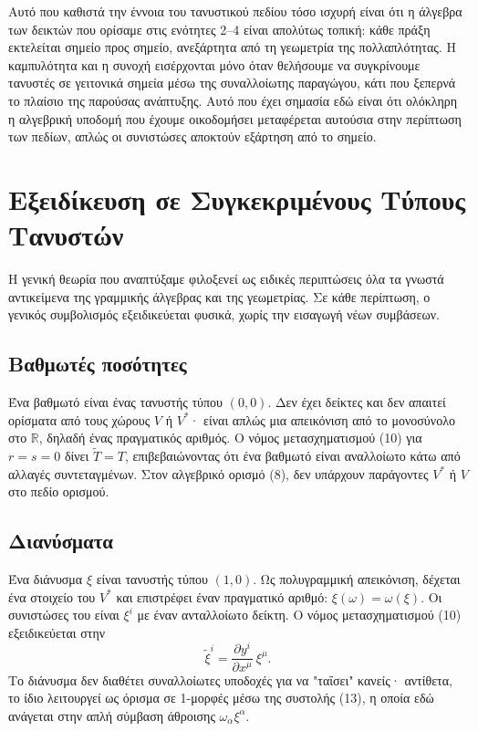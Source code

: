 \documentclass[12pt]{article}
\begin{document}
Αυτό που καθιστά την έννοια του τανυστικού πεδίου τόσο ισχυρή είναι ότι η άλγεβρα των δεικτών που ορίσαμε στις ενότητες 2–4 είναι απολύτως τοπική: κάθε πράξη εκτελείται σημείο προς σημείο, ανεξάρτητα από τη γεωμετρία της πολλαπλότητας. Η καμπυλότητα και η συνοχή εισέρχονται μόνο όταν θελήσουμε να συγκρίνουμε τανυστές σε γειτονικά σημεία μέσω της συναλλοίωτης παραγώγου, κάτι που ξεπερνά το πλαίσιο της παρούσας ανάπτυξης. Αυτό που έχει σημασία εδώ είναι ότι ολόκληρη η αλγεβρική υποδομή που έχουμε οικοδομήσει μεταφέρεται αυτούσια στην περίπτωση των πεδίων, απλώς οι συνιστώσες αποκτούν εξάρτηση από το σημείο.

\section{Εξειδίκευση σε Συγκεκριμένους Τύπους Τανυστών}

Η γενική θεωρία που αναπτύξαμε φιλοξενεί ως ειδικές περιπτώσεις όλα τα γνωστά αντικείμενα της γραμμικής άλγεβρας και της γεωμετρίας. Σε κάθε περίπτωση, ο γενικός συμβολισμός εξειδικεύεται φυσικά, χωρίς την εισαγωγή νέων συμβάσεων.

\subsection{Βαθμωτές ποσότητες}
Ένα βαθμωτό είναι ένας τανυστής τύπου \( (0,0) \). Δεν έχει δείκτες και δεν απαιτεί ορίσματα από τους χώρους \( V \) ή \( V^* \)· είναι απλώς μια απεικόνιση από το μονοσύνολο στο \( \mathbb{R} \), δηλαδή ένας πραγματικός αριθμός. Ο νόμος μετασχηματισμού (10) για \( r=s=0 \) δίνει \( \tilde{T} = T \), επιβεβαιώνοντας ότι ένα βαθμωτό είναι αναλλοίωτο κάτω από αλλαγές συντεταγμένων. Στον αλγεβρικό ορισμό (8), δεν υπάρχουν παράγοντες \( V^* \) ή \( V \) στο πεδίο ορισμού.

\subsection{Διανύσματα}
Ένα διάνυσμα \( \xi \) είναι τανυστής τύπου \( (1,0) \). Ως πολυγραμμική απεικόνιση, δέχεται ένα στοιχείο του \( V^* \) και επιστρέφει έναν πραγματικό αριθμό: \( \xi(\omega) = \omega(\xi) \). Οι συνιστώσες του είναι \( \xi^i \) με έναν ανταλλοίωτο δείκτη. Ο νόμος μετασχηματισμού (10) εξειδικεύεται στην
\[
\tilde{\xi}^i = \frac{\partial y^i}{\partial x^\mu} \ \xi^\mu. \tag{14}
\]
Το διάνυσμα δεν διαθέτει συναλλοίωτες υποδοχές για να "ταΐσει" κανείς· αντίθετα, το ίδιο λειτουργεί ως όρισμα σε 1-μορφές μέσω της συστολής (13), η οποία εδώ ανάγεται στην απλή σύμβαση άθροισης \( \omega_\alpha \xi^\alpha \).
\end{document}
